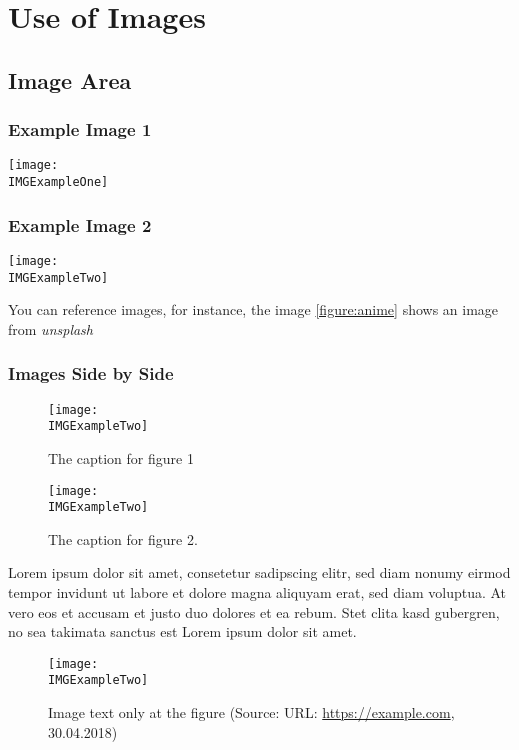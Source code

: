 \chapter{Use of Images}

\section{Image Area}
\subsection{Example Image 1}

\texttt{[image: \\IMGExampleOne]}

\subsection{Example Image 2}

\texttt{[image: \\IMGExampleTwo]}
\label{figure:anime}

You can reference images, for instance, the image \ref{figure:anime} shows
an image from \textit{unsplash}

\subsection{Images Side by Side}

\begin{figure}[htbp]
  \centering
  \begin{minipage}[b]{0.45\linewidth}
    \centering
    \texttt{[image: \\IMGExampleTwo]}
    \caption{The caption for figure 1}
    \label{fig:chapter001_dist_001}
  \end{minipage}
  \hspace{0.5cm}
  \begin{minipage}[b]{0.45\linewidth}
    \centering
    \texttt{[image: \\IMGExampleTwo]}
    \caption{The caption for figure 2.}
    \label{fig:chapter001_reward_001}
  \end{minipage}
\end{figure}

Lorem ipsum dolor sit amet, consetetur sadipscing elitr, sed diam nonumy eirmod tempor invidunt ut labore et dolore magna aliquyam erat, sed diam voluptua. At vero eos et accusam et justo duo dolores et ea rebum. Stet clita kasd gubergren, no sea takimata sanctus est Lorem ipsum dolor sit amet.

\begin{figure}[H]
    \centering
    \texttt{[image: \\IMGExampleTwo]}
    \caption[Image text in table of figures]{Image text only at the figure (Source: URL: \url{https://example.com}, 30.04.2018)}
\end{figure}
